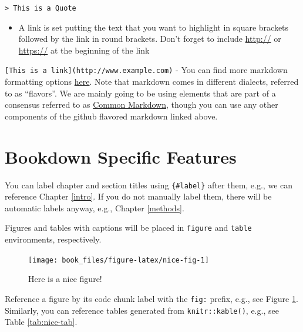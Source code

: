 \documentclass[]{tufte-book}
\providecommand{\tightlist}{%
  \setlength{\itemsep}{0pt}\setlength{\parskip}{0pt}}
\begin{document}
\texttt{\textgreater{}\ This\ is\ a\ Quote}

\begin{itemize}
\tightlist
\item
  A link is set putting the text that you want to highlight in square
  brackets followed by the link in round brackets. Don't forget to
  include \url{http://} or \url{https://} at the beginning of the link
\end{itemize}

\texttt{{[}This\ is\ a\ link{]}(http://www.example.com)} - You can find
more markdown formatting options
\href{https://guides.github.com/features/mastering-markdown/}{here}.
Note that markdown comes in different dialects, referred to as
``flavors''. We are mainly going to be using elements that are part of a
consensus referred to as \href{http://commonmark.org/}{Common Markdown},
though you can use any other components of the github flavored markdown
linked above.

\section{Bookdown Specific Features}\label{bookdown-specific-features}

You can label chapter and section titles using \texttt{\{\#label\}}
after them, e.g., we can reference Chapter \ref{intro}. If you do not
manually label them, there will be automatic labels anyway, e.g.,
Chapter \ref{methods}.

Figures and tables with captions will be placed in \texttt{figure} and
\texttt{table} environments, respectively.

\begin{figure}

{\centering \texttt{[image: book\_files/figure-latex/nice-fig-1]} 

}

\caption[Here is a nice figure!]{Here is a nice figure!}\label{fig:nice-fig}
\end{figure}

Reference a figure by its code chunk label with the \texttt{fig:}
prefix, e.g., see Figure \ref{fig:nice-fig}. Similarly, you can
reference tables generated from \texttt{knitr::kable()}, e.g., see Table
\ref{tab:nice-tab}.
\end{document}
